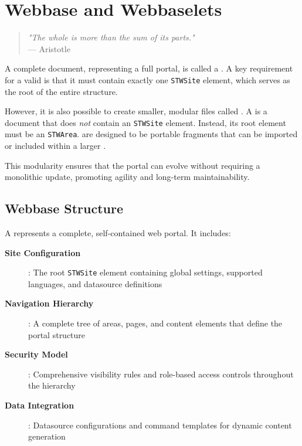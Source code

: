 
\chapter{Webbase and Webbaselets}
\label{chap:webbaselets}

\begin{quote}
\textit{"The whole is more than the sum of its parts."} \\
— Aristotle
\end{quote}

A complete \wbdl{} document, representing a full portal, is called a \textbf{\webbase{}}. A key requirement for a valid \webbase{} is that it must contain exactly one \texttt{STWSite} element, which serves as the root of the entire structure.

However, it is also possible to create smaller, modular \wbdl{} files called \textbf{}. A \webbaselet{} is a \wbdl{} document that does \emph{not} contain an \texttt{STWSite} element. Instead, its root element must be an \texttt{STWArea}.  are designed to be portable fragments that can be imported or included within a larger \webbase{}.

This modularity ensures that the portal can evolve without requiring a monolithic update, promoting agility and long-term maintainability.

\section{Webbase Structure}
\label{sec:webbase-structure}

A \webbase{} represents a complete, self-contained web portal. It includes:

\begin{description}
\item[\textbf{Site Configuration}]: The root \texttt{STWSite} element containing global settings, supported languages, and datasource definitions
\item[\textbf{Navigation Hierarchy}]: A complete tree of areas, pages, and content elements that define the portal structure
\item[\textbf{Security Model}]: Comprehensive visibility rules and role-based access controls throughout the hierarchy
\item[\textbf{Data Integration}]: Datasource configurations and command templates for dynamic content generation
\end{description}

